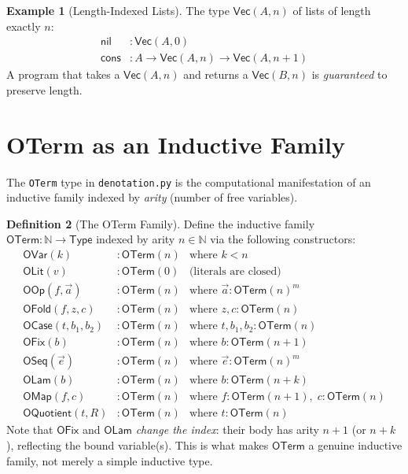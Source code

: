 \documentclass[11pt,a4paper]{report}
\theoremstyle{definition}
\newtheorem{definition}{Definition}[chapter]
\newtheorem{example}[definition]{Example}
\theoremstyle{plain}
\newcommand{\Nat}{\mathbb{N}}
\newcommand{\Type}{\mathsf{Type}}
\begin{document}
\begin{example}[Length-Indexed Lists]
The type $\mathsf{Vec}(A, n)$ of lists of length exactly $n$:
\begin{align}
  \mathsf{nil} &: \mathsf{Vec}(A, 0) \\
  \mathsf{cons} &: A \to \mathsf{Vec}(A, n) \to \mathsf{Vec}(A, n+1)
\end{align}
A program that takes a $\mathsf{Vec}(A, n)$ and returns a
$\mathsf{Vec}(B, n)$ is \emph{guaranteed} to preserve length.
\end{example}

\section{OTerm as an Inductive Family}

The \texttt{OTerm} type in \texttt{denotation.py} is the
computational manifestation of an inductive family indexed by
\emph{arity} (number of free variables).

\begin{definition}[The OTerm Family]
\label{def:oterm-family}
Define the inductive family $\mathsf{OTerm} : \Nat \to \Type$
indexed by arity $n \in \Nat$ via the following constructors:
\begin{align}
  \mathsf{OVar}(k)       &: \mathsf{OTerm}(n)
    & \text{where } k < n \\
  \mathsf{OLit}(v)       &: \mathsf{OTerm}(0)
    & \text{(literals are closed)} \\
  \mathsf{OOp}(f, \vec{a}) &: \mathsf{OTerm}(n)
    & \text{where } \vec{a} : \mathsf{OTerm}(n)^m \\
  \mathsf{OFold}(f, z, c) &: \mathsf{OTerm}(n)
    & \text{where } z, c : \mathsf{OTerm}(n) \\
  \mathsf{OCase}(t, b_1, b_2) &: \mathsf{OTerm}(n)
    & \text{where } t, b_1, b_2 : \mathsf{OTerm}(n) \\
  \mathsf{OFix}(b)       &: \mathsf{OTerm}(n)
    & \text{where } b : \mathsf{OTerm}(n{+}1) \\
  \mathsf{OSeq}(\vec{e}) &: \mathsf{OTerm}(n)
    & \text{where } \vec{e} : \mathsf{OTerm}(n)^m \\
  \mathsf{OLam}(b)       &: \mathsf{OTerm}(n)
    & \text{where } b : \mathsf{OTerm}(n{+}k) \\
  \mathsf{OMap}(f, c)    &: \mathsf{OTerm}(n)
    & \text{where } f : \mathsf{OTerm}(n{+}1),\; c : \mathsf{OTerm}(n) \\
  \mathsf{OQuotient}(t, R)  &: \mathsf{OTerm}(n)
    & \text{where } t : \mathsf{OTerm}(n)
\end{align}
Note that $\mathsf{OFix}$ and $\mathsf{OLam}$ \emph{change the index}:
their body has arity $n{+}1$ (or $n{+}k$), reflecting the bound
variable(s).  This is what makes $\mathsf{OTerm}$ a genuine inductive
family, not merely a simple inductive type.
\end{definition}
\end{document}
